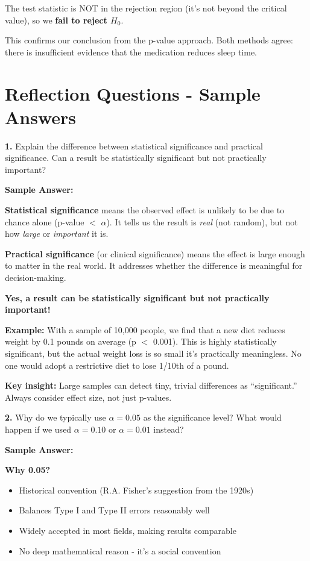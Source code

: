 \documentclass[11pt]{article}
\begin{document}
The test statistic is NOT in the rejection region (it's not beyond the critical value), so we \textbf{fail to reject $H_0$}.

This confirms our conclusion from the p-value approach. Both methods agree: there is insufficient evidence that the medication reduces sleep time.

\newpage

\section*{Reflection Questions - Sample Answers}

\textbf{1.} Explain the difference between statistical significance and practical significance. Can a result be statistically significant but not practically important?

\textcolor{answergreen}{\textbf{Sample Answer:}}

\textbf{Statistical significance} means the observed effect is unlikely to be due to chance alone (p-value $<$ $\alpha$). It tells us the result is \textit{real} (not random), but not how \textit{large} or \textit{important} it is.

\textbf{Practical significance} (or clinical significance) means the effect is large enough to matter in the real world. It addresses whether the difference is meaningful for decision-making.

\textbf{Yes, a result can be statistically significant but not practically important!}

\textbf{Example:} With a sample of 10,000 people, we find that a new diet reduces weight by 0.1 pounds on average (p $<$ 0.001). This is highly statistically significant, but the actual weight loss is so small it's practically meaningless. No one would adopt a restrictive diet to lose 1/10th of a pound.

\textbf{Key insight:} Large samples can detect tiny, trivial differences as ``significant.'' Always consider effect size, not just p-values.

\vspace{6pt}

\textbf{2.} Why do we typically use $\alpha = 0.05$ as the significance level? What would happen if we used $\alpha = 0.10$ or $\alpha = 0.01$ instead?

\textcolor{answergreen}{\textbf{Sample Answer:}}

\textbf{Why 0.05?}
\begin{itemize}
\item Historical convention (R.A. Fisher's suggestion from the 1920s)
\item Balances Type I and Type II errors reasonably well
\item Widely accepted in most fields, making results comparable
\item No deep mathematical reason - it's a social convention
\end{itemize}
\end{document}
